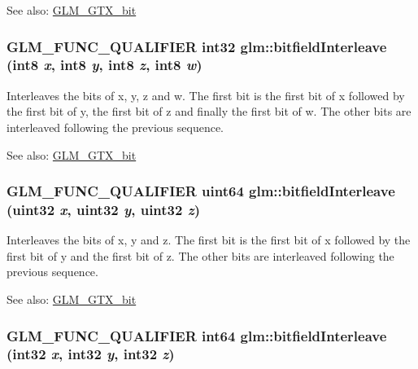 \begin{Desc}
\item[See also:]\hyperlink{group__gtx__bit}{GLM\_\-GTX\_\-bit} \end{Desc}
\hypertarget{group__gtx__bit_g7da84ecc2b3a46c9c08a9f40012359cf}{
\subsubsection[bitfieldInterleave]{\setlength{\rightskip}{0pt plus 5cm}GLM\_\-FUNC\_\-QUALIFIER int32 glm::bitfieldInterleave (int8 {\em x}, \/  int8 {\em y}, \/  int8 {\em z}, \/  int8 {\em w})}}
\label{group__gtx__bit_g7da84ecc2b3a46c9c08a9f40012359cf}


Interleaves the bits of x, y, z and w. The first bit is the first bit of x followed by the first bit of y, the first bit of z and finally the first bit of w. The other bits are interleaved following the previous sequence.

\begin{Desc}
\item[See also:]\hyperlink{group__gtx__bit}{GLM\_\-GTX\_\-bit} \end{Desc}
\hypertarget{group__gtx__bit_g7c10eb37f608365cfaef5ca2c476e1ce}{
\subsubsection[bitfieldInterleave]{\setlength{\rightskip}{0pt plus 5cm}GLM\_\-FUNC\_\-QUALIFIER uint64 glm::bitfieldInterleave (uint32 {\em x}, \/  uint32 {\em y}, \/  uint32 {\em z})}}
\label{group__gtx__bit_g7c10eb37f608365cfaef5ca2c476e1ce}


Interleaves the bits of x, y and z. The first bit is the first bit of x followed by the first bit of y and the first bit of z. The other bits are interleaved following the previous sequence.

\begin{Desc}
\item[See also:]\hyperlink{group__gtx__bit}{GLM\_\-GTX\_\-bit} \end{Desc}
\hypertarget{group__gtx__bit_g64e2d84f6560af3cc639644b1e628c42}{
\subsubsection[bitfieldInterleave]{\setlength{\rightskip}{0pt plus 5cm}GLM\_\-FUNC\_\-QUALIFIER int64 glm::bitfieldInterleave (int32 {\em x}, \/  int32 {\em y}, \/  int32 {\em z})}}
\label{group__gtx__bit_g64e2d84f6560af3cc639644b1e628c42}


